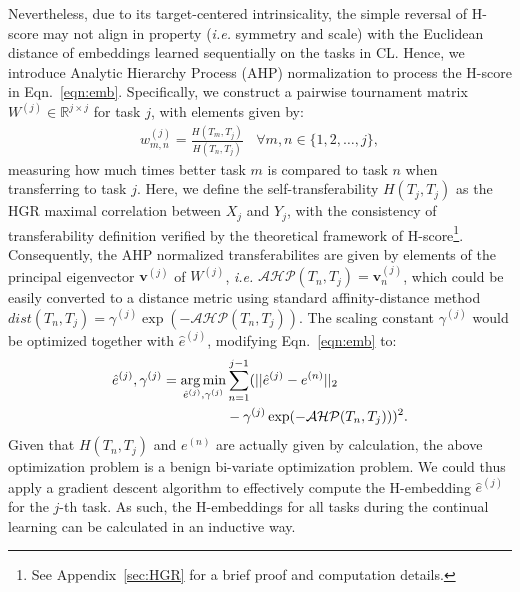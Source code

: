 Nevertheless, due to its target-centered intrinsicality, the simple reversal of H-score may not align in property (\textit{i.e.} symmetry and scale) with the Euclidean distance of embeddings learned sequentially on the tasks in CL. Hence, we introduce Analytic Hierarchy Process (AHP) normalization \citep{zamir2018taskonomy} to process the H-score in Eqn.~\ref{eqn:emb}. 
Specifically, we construct a pairwise tournament matrix $W^{(j)} \in \mathbb{R}^{j\times j}$ for task $j$, with elements given by:
\begin{align}
    w^{(j)}_{m,n} = \frac{H(T_m, T_j)}{H(T_n, T_j)}\ \ \ \  \forall m, n\in \{1,2,\dots,j\},
\end{align}
measuring how much times better task $m$ is compared to task $n$ when transferring to task $j$. Here, we define the self-transferability $H(T_j,T_j)$ as the HGR maximal correlation between $X_j$ and $Y_j$, with the consistency of transferability definition verified by the theoretical framework of H-score\footnote{See Appendix~\ref{sec:HGR} for a brief proof and computation details.}. Consequently, the AHP normalized transferabilites are given by elements of the principal eigenvector $\mathbf{v}^{(j)}$ of $W^{(j)}$, \textit{i.e.} $\mathcal{AHP}(T_n,T_j) =  \mathbf{v}^{(j)}_n$, which could be easily converted to a distance metric using standard affinity-distance method $dist(T_n,T_j) = \gamma^{(j)}\exp(-\mathcal{AHP}(T_n,T_j))$. The scaling constant $\gamma^{(j)}$ would be optimized together with $\hat{e}^{(j)}$, modifying Eqn.~\ref{eqn:emb} to:
\begin{align}
    \hat{e}^{(j)}, \gamma^{(j)} = \operatorname*{arg\,min}_{\hat{e}^{(j)}, \gamma^{(j)}} &\sum_{n=1}^{j-1} (||\hat{e}^{(j)} - e^{(n)}||_2 \\
    &- \gamma^{(j)}\exp(-\mathcal{AHP}(T_n,T_j)))^2.
    \label{eqn:get_emb} \nonumber
\end{align}
Given that $H(T_n, T_j)$ and $e^{(n)}$ are actually given by calculation, the above optimization problem is a benign bi-variate optimization problem. We could thus apply a gradient descent algorithm to effectively compute the H-embedding $\hat{e}^{(j)}$ for the $j$-th task. As such, the H-embeddings for all tasks during the continual learning can be calculated in an inductive way.


